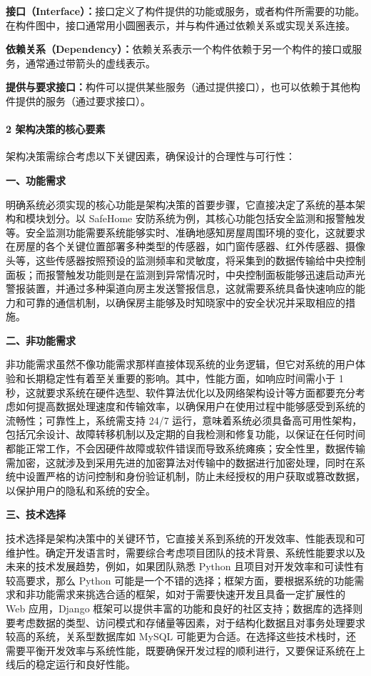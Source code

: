\textbf{接口（Interface）：}接口定义了构件提供的功能或服务，或者构件所需要的功能。在构件图中，接口通常用小圆圈表示，并与构件通过依赖关系或实现关系连接。

\textbf{依赖关系（Dependency）：}依赖关系表示一个构件依赖于另一个构件的接口或服务，通常通过带箭头的虚线表示。

\textbf{提供与要求接口：}构件可以提供某些服务（通过提供接口），也可以依赖于其他构件提供的服务（通过要求接口）。

\paragraph{2 架构决策的核心要素}\label{ux67b6ux6784ux51b3ux7b56ux7684ux6838ux5fc3ux8981ux7d20}

架构决策需综合考虑以下关键因素，确保设计的合理性与可行性：

\textbf{一、功能需求}

明确系统必须实现的核心功能是架构决策的首要步骤，它直接决定了系统的基本架构和模块划分。以 SafeHome 安防系统为例，其核心功能包括安全监测和报警触发等。安全监测功能需要系统能够实时、准确地感知房屋周围环境的变化，这就要求在房屋的各个关键位置部署多种类型的传感器，如门窗传感器、红外传感器、摄像头等，这些传感器按照预设的监测频率和灵敏度，将采集到的数据传输给中央控制面板；而报警触发功能则是在监测到异常情况时，中央控制面板能够迅速启动声光警报装置，并通过多种渠道向房主发送警报信息，这就需要系统具备快速响应的能力和可靠的通信机制，以确保房主能够及时知晓家中的安全状况并采取相应的措施。

\textbf{二、非功能需求}

非功能需求虽然不像功能需求那样直接体现系统的业务逻辑，但它对系统的用户体验和长期稳定性有着至关重要的影响。其中，性能方面，如响应时间需小于 1 秒，这就要求系统在硬件选型、软件算法优化以及网络架构设计等方面都要充分考虑如何提高数据处理速度和传输效率，以确保用户在使用过程中能够感受到系统的流畅性；可靠性上，系统需支持 24/7 运行，意味着系统必须具备高可用性架构，包括冗余设计、故障转移机制以及定期的自我检测和修复功能，以保证在任何时间都能正常工作，不会因硬件故障或软件错误而导致系统瘫痪；安全性里，数据传输需加密，这就涉及到采用先进的加密算法对传输中的数据进行加密处理，同时在系统中设置严格的访问控制和身份验证机制，防止未经授权的用户获取或篡改数据，以保护用户的隐私和系统的安全。

\textbf{三、技术选择}

技术选择是架构决策中的关键环节，它直接关系到系统的开发效率、性能表现和可维护性。确定开发语言时，需要综合考虑项目团队的技术背景、系统性能要求以及未来的技术发展趋势，例如，如果团队熟悉 Python 且项目对开发效率和可读性有较高要求，那么 Python 可能是一个不错的选择；框架方面，要根据系统的功能需求和非功能需求来挑选合适的框架，如对于需要快速开发且具备一定扩展性的 Web 应用，Django 框架可以提供丰富的功能和良好的社区支持；数据库的选择则要考虑数据的类型、访问模式和存储量等因素，对于结构化数据且对事务处理要求较高的系统，关系型数据库如 MySQL 可能更为合适。在选择这些技术栈时，还需要平衡开发效率与系统性能，既要确保开发过程的顺利进行，又要保证系统在上线后的稳定运行和良好性能。

